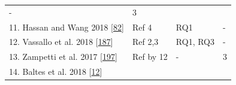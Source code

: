 \documentclass[]{book}
\begin{document}
\begin{longtable}[]{@{}llll@{}}
\begin{minipage}[t]{0.14\columnwidth}
-\strut
\end{minipage} & \begin{minipage}[t]{0.06\columnwidth}\raggedright\strut
3\strut
\end{minipage}\tabularnewline
\begin{minipage}[t]{0.48\columnwidth}\raggedright\strut
11. Hassan and Wang 2018
{[}\protect\hyperlink{ref-hassan2018hirebuild}{82}{]}\strut
\end{minipage} & \begin{minipage}[t]{0.20\columnwidth}\raggedright\strut
Ref 4\strut
\end{minipage} & \begin{minipage}[t]{0.14\columnwidth}\raggedright\strut
RQ1\strut
\end{minipage} & \begin{minipage}[t]{0.06\columnwidth}\raggedright\strut
-\strut
\end{minipage}\tabularnewline
\begin{minipage}[t]{0.48\columnwidth}\raggedright\strut
12. Vassallo et al. 2018
{[}\protect\hyperlink{ref-vassallo2018break}{187}{]}\strut
\end{minipage} & \begin{minipage}[t]{0.20\columnwidth}\raggedright\strut
Ref 2,3\strut
\end{minipage} & \begin{minipage}[t]{0.14\columnwidth}\raggedright\strut
RQ1, RQ3\strut
\end{minipage} & \begin{minipage}[t]{0.06\columnwidth}\raggedright\strut
-\strut
\end{minipage}\tabularnewline
\begin{minipage}[t]{0.48\columnwidth}\raggedright\strut
13. Zampetti et al. 2017
{[}\protect\hyperlink{ref-zampetti2017open}{197}{]}\strut
\end{minipage} & \begin{minipage}[t]{0.20\columnwidth}\raggedright\strut
Ref by 12\strut
\end{minipage} & \begin{minipage}[t]{0.14\columnwidth}\raggedright\strut
-\strut
\end{minipage} & \begin{minipage}[t]{0.06\columnwidth}\raggedright\strut
3\strut
\end{minipage}\tabularnewline
\begin{minipage}[t]{0.48\columnwidth}\raggedright\strut
14. Baltes et al. 2018
{[}\protect\hyperlink{ref-baltes2018no}{12}{]}\strut

\end{minipage}
\end{longtable}
\end{document}
